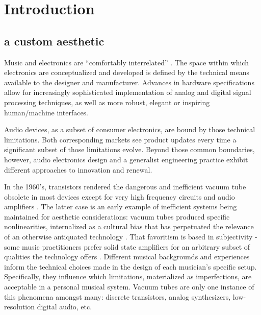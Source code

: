 \chapter{Introduction}\label{introduction}



\section{a custom aesthetic}

Music and electronics are ``comfortably interrelated'' \citep{kettelkamp1984}. The space within which electronics are conceptualized and developed is defined by the technical means available to the designer and manufacturer. Advances in hardware specifications allow for increasingly sophisticated implementation of analog and digital signal processing techniques, as well as more robust, elegant or inspiring human/machine interfaces.  
	
Audio devices, as a subset of consumer electronics, are bound by those technical limitations. Both corresponding markets see product updates every time a significant subset of those limitations evolve. Beyond those common boundaries, however, audio electronics design and a generalist engineering practice exhibit different approaches to innovation and renewal. 

In the 1960's, transistors rendered the dangerous and inefficient vacuum tube obsolete in most devices except for very high frequency circuits and audio amplifiers \citep{barbour1998}. The latter case is an early example of inefficient systems being maintained for aesthetic considerations: vacuum tubes produced specific nonlinearities, internalized as a cultural bias that has perpetuated the relevance of an otherwise antiquated technology \citep{barbour1998}. That favoritism is based in subjectivity - some music practitioners prefer solid state amplifiers for an arbitrary subset of qualities the technology offers \citep{hamm1973}. Different musical backgrounds and experiences inform the technical choices made in the design of each musician's specific setup. Specifically, they influence which limitations, materialized as imperfections, are acceptable in a personal musical system. Vacuum tubes are only one instance of this phenomena amongst many: discrete transistors, analog synthesizers, low-resolution digital audio, etc.  

